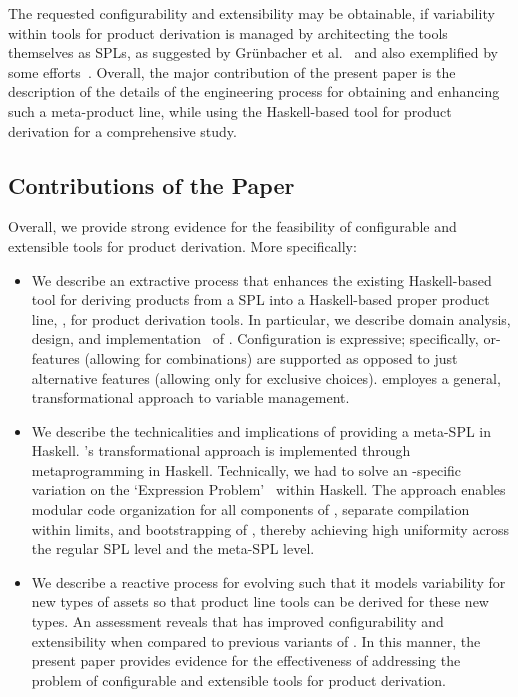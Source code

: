 

The requested configurability and extensibility may be obtainable, if variability within tools for product derivation is managed by architecting the tools themselves as SPLs, as suggested by Gr{\"u}nbacher et al.~\cite{grunbacher:2008} and also exemplified by some efforts~\cite{grunbacher:2011,batory-ahead-bootstrap}. Overall, the major contribution of the present paper is the description of the details of the engineering process for obtaining and enhancing such a meta-product line, while using the Haskell-based \hp{} tool for product derivation for a comprehensive study.


\subsection*{Contributions of the Paper}

Overall, we provide strong evidence for the feasibility of configurable and extensible tools for product derivation. More specifically:

\begin{itemize}

\item We describe an extractive process that enhances the existing Haskell-based tool \hp{} for deriving products from a SPL into a Haskell-based proper product line, \hpl, for product derivation tools. In particular, we describe domain analysis, design, and implementation~\cite{gpbook} of \hpl. Configuration is expressive; specifically, or-features (allowing for combinations) are supported as opposed to just alternative features (allowing only for exclusive choices). \hpl{} employes a general, transformational approach to variable management.

\item We describe the technicalities and implications of providing a meta-SPL in Haskell. \hpl's transformational approach is implemented through metaprogramming in Haskell. Technically, we had to solve an \hp-specific variation on the `Expression Problem'~\cite{Wadler98,Lopez-HerrejonBC05} within Haskell. The approach enables modular code organization for all components of \hpl, separate compilation within limits, and bootstrapping of \hpl, thereby achieving high uniformity across the regular SPL level and the meta-SPL level.

\item We describe a reactive process for evolving \hpl{} such that it models variability for new types of assets so that product line tools can be derived for these new types. An assessment reveals that \hpl{} has improved configurability and extensibility when compared to previous variants of \hp. In this manner, the present paper provides evidence for the effectiveness of addressing the problem of configurable and extensible tools for product derivation.

\end{itemize}

